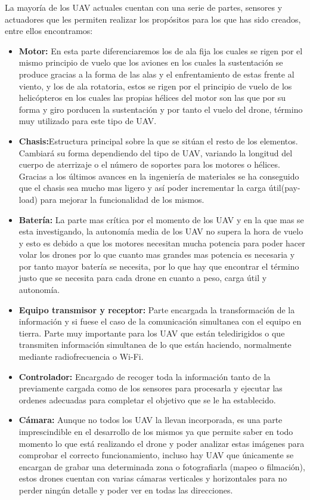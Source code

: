 \hspace{1cm} La mayoría de los UAV actuales cuentan con una serie de partes, sensores y actuadores que les permiten realizar los propósitos para los que has sido creados, entre ellos encontramos: 
	\begin{itemize}
		\item \textbf{Motor:} En esta parte diferenciaremos los de ala fija los cuales se rigen por el mismo principio de vuelo que los aviones en los cuales la sustentación se produce gracias a la forma de las alas y el enfrentamiento de estas frente al viento, y los de ala rotatoria, estos se rigen por el principio de vuelo de los helicópteros en los cuales las propias hélices del motor son las que por su forma y giro porducen la sustentación y por tanto el vuelo del drone, término muy utilizado para este tipo de UAV. 
		\item \textbf{Chasis:}Estructura principal  sobre  la  que  se sitúan el resto de los elementos. Cambiará su forma dependiendo del tipo de UAV, variando la longitud del cuerpo de aterrizaje o el número de soportes para los motores o hélices. Gracias a los últimos avances en la ingeniería de materiales se ha conseguido que el chasis sea mucho mas ligero y así poder incrementar la carga útil(pay-load) para mejorar la funcionalidad de los mismos.
		\item \textbf{Batería:} La parte mas crítica por el momento de los UAV y en la que mas se esta investigando, la autonomía media de los UAV no supera la hora de vuelo y esto es debido a que los motores necesitan mucha potencia para poder hacer volar los drones por lo que cuanto mas grandes mas potencia es necesaria y por tanto mayor batería se necesita, por lo que hay que encontrar el término justo que se necesita para cada drone en cuanto a peso, carga útil y autonomía. 
		\item \textbf{Equipo transmisor y receptor:} Parte encargada la transformación de la información y si fuese el caso de la comunicación simultanea con el equipo en tierra. Parte muy importante para los UAV que están teledirigidos o que transmiten información simultanea de lo que están haciendo, normalmente mediante radiofrecuencia o Wi-Fi.
		\item \textbf{Controlador:} Encargado de recoger toda la información tanto de la previamente cargada como de los sensores para procesarla y ejecutar las ordenes adecuadas para completar el objetivo que se le ha establecido. 
		\item \textbf{Cámara:} Aunque no todos los UAV la llevan incorporada, es una parte imprescindible en el desarrollo de los mismos ya que permite saber en todo momento lo que está realizando el drone y poder analizar estas imágenes para comprobar el correcto funcionamiento, incluso hay UAV que únicamente se encargan de grabar una determinada zona o fotografiarla (mapeo o filmación), estos drones cuentan con varias cámaras verticales y horizontales para no perder ningún detalle y poder ver en todas las direcciones.

\end{itemize}
